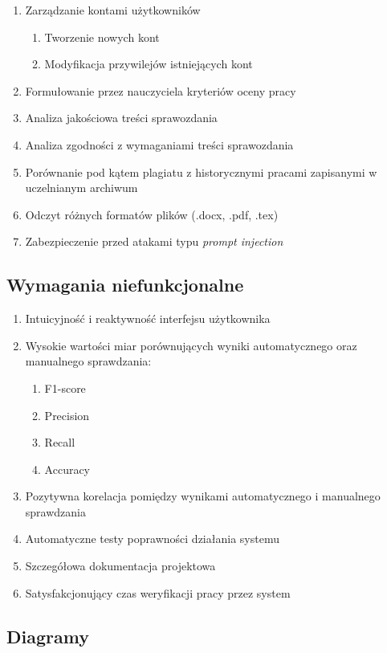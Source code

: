 \documentclass[a4paper, 12pt]{article}
\begin{document}
\begin{enumerate}
    \item Zarządzanie kontami użytkowników
    \begin{enumerate}
        \item Tworzenie nowych kont
        \item Modyfikacja przywilejów istniejących kont
    \end{enumerate}
    \item Formułowanie przez nauczyciela kryteriów oceny pracy
    \item Analiza jakościowa treści sprawozdania
    \item Analiza zgodności z wymaganiami treści sprawozdania
    \item Porównanie pod kątem plagiatu z historycznymi pracami zapisanymi w uczelnianym archiwum
    \item Odczyt różnych formatów plików (.docx, .pdf, .tex)
    \item Zabezpieczenie przed atakami typu \textit{prompt injection}
\end{enumerate}

\subsection{Wymagania niefunkcjonalne}

\begin{enumerate}
    \item Intuicyjność i reaktywność interfejsu użytkownika
    \item Wysokie wartości miar porównujących wyniki automatycznego oraz manualnego sprawdzania:
    \begin{enumerate}
        \item F1-score
        \item Precision
        \item Recall
        \item Accuracy
    \end{enumerate}
    \item Pozytywna korelacja pomiędzy wynikami automatycznego i manualnego sprawdzania
    \item Automatyczne testy poprawności działania systemu
    \item Szczegółowa dokumentacja projektowa
    \item Satysfakcjonujący czas weryfikacji pracy przez system
\end{enumerate}

\subsection{Diagramy}
\end{document}
